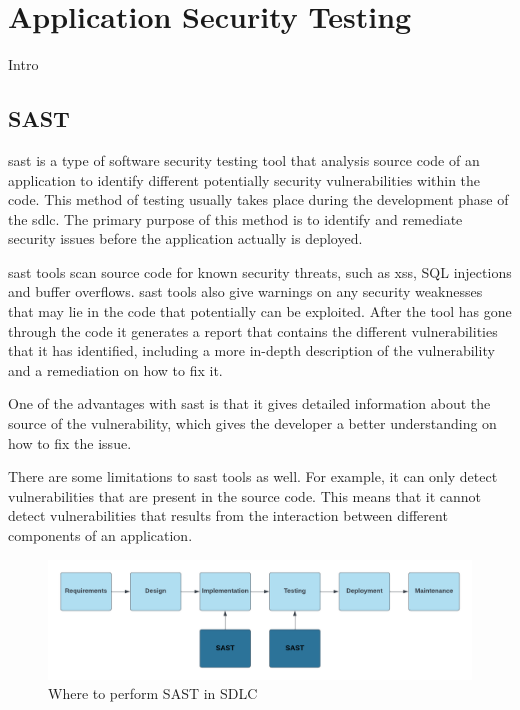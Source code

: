 \section{Application Security Testing}
Intro

\subsection{SAST}
\acrlong{sast} is a type of software security testing tool that analysis source code of an application to identify different potentially security vulnerabilities within the code. This method of testing usually takes place during the development phase of the \acrlong{sdlc}. The primary purpose of this method is to identify and remediate security issues before the application actually is deployed. \cite{sast}

\acrshort{sast} tools scan source code for known security threats, such as \acrlong{xss}, SQL injections and buffer overflows. \acrshort{sast} tools also give warnings on any security weaknesses that may lie in the code that potentially can be exploited. After the tool has gone through the code it generates a report that contains the different vulnerabilities that it has identified, including a more in-depth description of the vulnerability and a remediation on how to fix it. 

One of the advantages with \acrshort{sast} is that it gives detailed information about the source of the vulnerability, which gives the developer a better understanding on how to fix the issue. 

There are some limitations to \acrshort{sast} tools as well. For example, it can only detect vulnerabilities that are present in the source code. This means that it cannot detect vulnerabilities that results from the interaction between different components of an application.
\begin{figure}[htp]
    \centering
    \includegraphics[width=1\columnwidth]{Images/SAST.png}
    \caption{Where to perform SAST in SDLC}
    \label{fig:my_label}
\end{figure}

